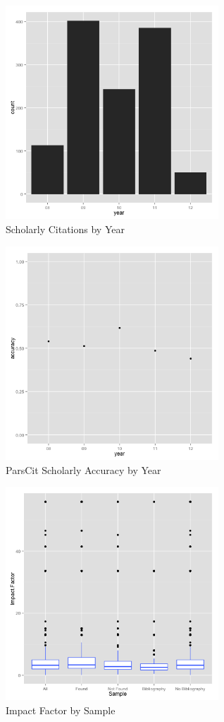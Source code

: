 \documentclass[12pt]{article}
\begin{document}
\begin{figure}
\begin{center}
\includegraphics[height=8cm]{scholarly_totals.png}
\caption{Scholarly Citations by Year}
\label{fig:scholarlytotals}
\end{center}
\end{figure}

\begin{figure}
\begin{center}
\includegraphics[height=8cm]{scholarly_accuracy.png}
\caption{ParsCit Scholarly Accuracy by Year}
\label{fig:scholarlyaccuracy}
\end{center}
\end{figure}

\begin{figure}
\begin{center}
\includegraphics[height=8cm]{impacts.png}
\caption{Impact Factor by Sample}
\label{fig:impacts}
\end{center}
\end{figure}
\end{document}
